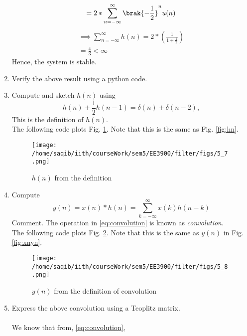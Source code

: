 \documentclass[journal,12pt,twocolumn]{IEEEtran}
\renewcommand\thesection{\arabic{section}}
\begin{document}
\begin{enumerate}[label=\thesection.\arabic*]
\begin{align}
	\\ = 2*\sum_{n=-\infty}^{\infty} \brak{-\frac{1}{2}}^{n}u(n)
\end{align}
\begin{align}
	\implies \sum_{n=-\infty}^{\infty}h(n) = 2*(\frac{1}{1+\frac{1}{2}})
	\\= \frac{4}{3} < \infty
\end{align}
Hence, the system is stable.
\item Verify the above result using a python code.
\solution\\

\item Compute and sketch $h(n)$ using 
\begin{equation}
\label{eq:iir_filter_h}
h(n) + \frac{1}{2}h(n-1) = \delta(n) + \delta(n-2), 
\end{equation}
%
This is the definition of $h(n)$.
\\
\solution The following code plots Fig. \ref{fig:hndef}. Note that this is the same as Fig. 
\ref{fig:hn}. 
%

\begin{figure}[!ht]
\centering
\texttt{[image: /home/saqib/iith/courseWork/sem5/EE3900/filter/figs/5\_7.png]}
\caption{$h(n)$ from the definition}
\label{fig:hndef}
\end{figure}
%
\item Compute 
%
\begin{equation}
\label{eq:convolution}
y(n) = x(n)*h(n) = \sum_{k=-\infty}^{\infty}x(k)h(n-k)
\end{equation}
%
Comment. The operation in \eqref{eq:convolution} is known as
{\em convolution}.
%
\\
\solution The following code plots Fig. \ref{fig:ynconv}. Note that this is the same as 
$y(n)$ in  Fig. 
\ref{fig:xnyn}. 
%

\begin{figure}[!ht]
\centering
\texttt{[image: /home/saqib/iith/courseWork/sem5/EE3900/filter/figs/5\_8.png]}
\caption{$y(n)$ from the definition of convolution}
\label{fig:ynconv}
\end{figure}
\item Express the above convolution using a Teoplitz matrix.
\\\solution\\
We know that from, \eqref{eq:convolution},
\begin{equation}

\end{equation}
\end{enumerate}
\end{document}
